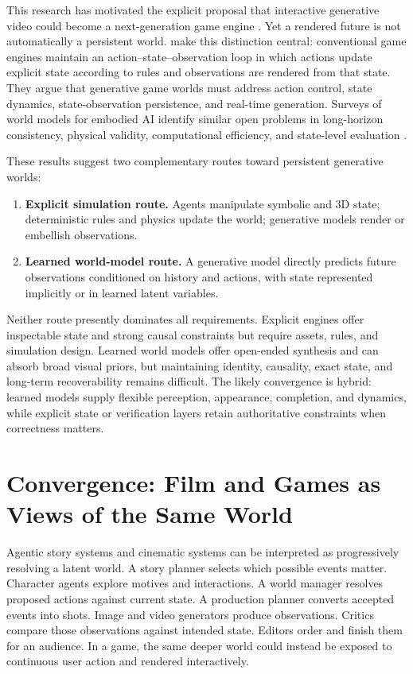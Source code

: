 \documentclass{article}
\begin{document}
This research has motivated the explicit proposal that interactive generative video could become a next-generation game engine \citep{yu2025generativegameengines}. Yet a rendered future is not automatically a persistent world. \citet{li2026pixelstostates} make this distinction central: conventional game engines maintain an action--state--observation loop in which actions update explicit state according to rules and observations are rendered from that state. They argue that generative game worlds must address action control, state dynamics, state-observation persistence, and real-time generation. Surveys of world models for embodied AI identify similar open problems in long-horizon consistency, physical validity, computational efficiency, and state-level evaluation \citep{li2025worldmodelsurvey}.

These results suggest two complementary routes toward persistent generative worlds:

\begin{enumerate}[leftmargin=*]
  \item \textbf{Explicit simulation route.} Agents manipulate symbolic and 3D state; deterministic rules and physics update the world; generative models render or embellish observations.
  \item \textbf{Learned world-model route.} A generative model directly predicts future observations conditioned on history and actions, with state represented implicitly or in learned latent variables.
\end{enumerate}

Neither route presently dominates all requirements. Explicit engines offer inspectable state and strong causal constraints but require assets, rules, and simulation design. Learned world models offer open-ended synthesis and can absorb broad visual priors, but maintaining identity, causality, exact state, and long-term recoverability remains difficult. The likely convergence is hybrid: learned models supply flexible perception, appearance, completion, and dynamics, while explicit state or verification layers retain authoritative constraints when correctness matters.

\section{Convergence: Film and Games as Views of the Same World}
\label{sec:convergence}

Agentic story systems and cinematic systems can be interpreted as progressively resolving a latent world. A story planner selects which possible events matter. Character agents explore motives and interactions. A world manager resolves proposed actions against current state. A production planner converts accepted events into shots. Image and video generators produce observations. Critics compare those observations against intended state. Editors order and finish them for an audience. In a game, the same deeper world could instead be exposed to continuous user action and rendered interactively.
\end{document}
